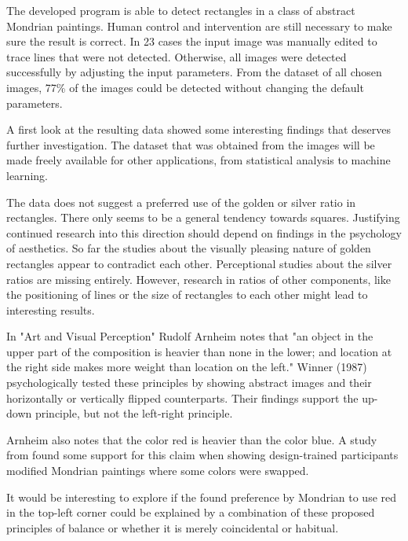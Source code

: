 \documentclass[serif,article,noparskip]{agse-thesis}
\begin{document}
The developed program is able to detect rectangles in a class of abstract
Mondrian paintings. Human control and intervention are still necessary to make
sure the result is correct. In 23 cases the input image was manually edited to
trace lines that were not detected. Otherwise, all images were detected
successfully by adjusting the input parameters. From the dataset of all chosen
images, 77\% of the images could be detected without changing the default
parameters.

A first look at the resulting data showed some interesting findings that deserves
further investigation. The dataset that was obtained from the images will be made
freely available for other applications, from statistical analysis to machine
learning.

The data does not suggest a preferred use of the golden or silver ratio in
rectangles. There only seems to be a general tendency towards squares.
Justifying continued research into this direction should depend on findings in
the psychology of aesthetics. So far the studies about the visually pleasing
nature of golden rectangles appear to contradict each other. Perceptional
studies about the silver ratios are missing entirely. However, research in  ratios
of other components, like the positioning of lines or the size of rectangles to
each other might lead to interesting results.

In "Art and Visual Perception" Rudolf Arnheim \cite{Arnheim1965} notes that "an
object in the upper part of the composition is heavier than none in the lower;
and location at the right side makes more weight than location on the left."
Winner (1987) \cite{Winner1987} psychologically tested these principles by
showing abstract images and their horizontally or vertically flipped
counterparts. Their findings support the up-down principle, but not the
left-right principle.

Arnheim also notes that the color red is heavier than the color blue. A study
from \cite{Locher2005} found some support for this claim when showing
design-trained participants modified Mondrian paintings where some colors were
swapped.

It would be interesting to explore if the found preference by Mondrian to use
red in the top-left corner could be explained by a combination of these proposed
principles of balance or whether it is merely coincidental or habitual.








% 
\end{document}
